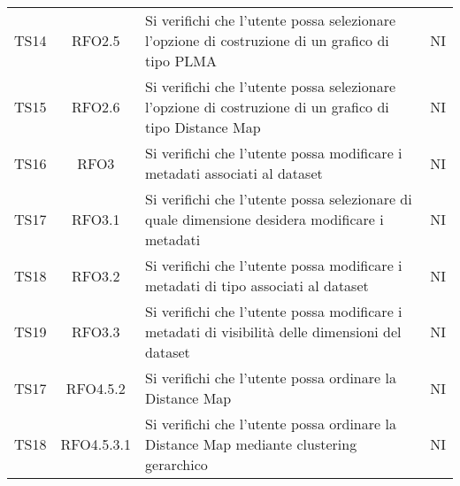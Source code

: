 \documentclass[../piano_di_qualifica.tex]{subfiles}
\begin{document}
\begin{center}
\begin{longtable}{|c|c|p{8cm}|c|}
		TS14 &  RFO2.5     & Si verifichi che l'utente possa selezionare l'opzione di costruzione di un grafico di tipo PLMA & NI \\
		TS15 &  RFO2.6     & Si verifichi che l'utente possa selezionare l'opzione di costruzione di un grafico di tipo Distance Map & NI \\
		TS16 & RFO3     & Si verifichi che l'utente possa modificare i metadati associati al dataset & NI \\
		TS17 & RFO3.1     & Si verifichi che l'utente possa selezionare di quale dimensione desidera modificare i metadati & NI \\
		TS18 & RFO3.2     & Si verifichi che l'utente possa modificare i metadati di tipo associati al dataset & NI \\
		TS19 & RFO3.3     & Si verifichi che l'utente possa modificare i metadati di visibilità delle dimensioni del dataset & NI \\
		TS17 & RFO4.5.2     & Si verifichi che l'utente possa ordinare la Distance Map & NI \\
		TS18 & RFO4.5.3.1     & Si verifichi che l'utente possa ordinare la Distance Map mediante clustering gerarchico & NI \\
		

\end{longtable}
\end{center}
\end{document}
